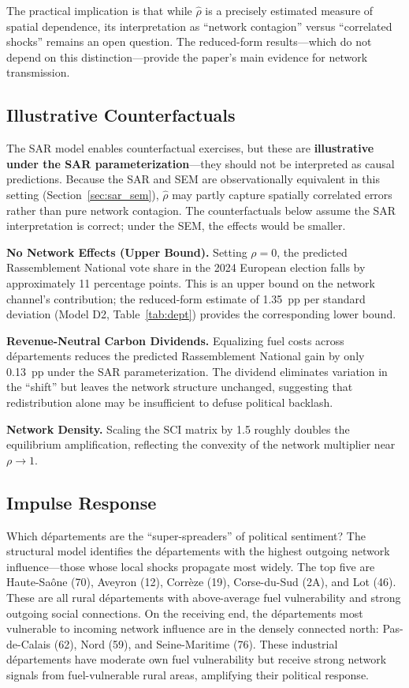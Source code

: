 \documentclass[12pt]{article}
\newcommand{\rn}{Rassemblement National}
\newcommand{\depts}{d\'{e}partements}
\begin{document}
The practical implication is that while $\hat{\rho}$ is a precisely estimated measure of spatial dependence, its interpretation as ``network contagion'' versus ``correlated shocks'' remains an open question. The reduced-form results---which do not depend on this distinction---provide the paper's main evidence for network transmission.

\subsection{Illustrative Counterfactuals}

The SAR model enables counterfactual exercises, but these are \textbf{illustrative under the SAR parameterization}---they should not be interpreted as causal predictions. Because the SAR and SEM are observationally equivalent in this setting (Section~\ref{sec:sar_sem}), $\hat{\rho}$ may partly capture spatially correlated errors rather than pure network contagion. The counterfactuals below assume the SAR interpretation is correct; under the SEM, the effects would be smaller.

\textbf{No Network Effects (Upper Bound).} Setting $\rho = 0$, the predicted \rn{} vote share in the 2024 European election falls by approximately 11 percentage points. This is an upper bound on the network channel's contribution; the reduced-form estimate of 1.35~pp per standard deviation (Model D2, Table~\ref{tab:dept}) provides the corresponding lower bound.

\textbf{Revenue-Neutral Carbon Dividends.} Equalizing fuel costs across \depts{} reduces the predicted \rn{} gain by only 0.13~pp under the SAR parameterization. The dividend eliminates variation in the ``shift'' but leaves the network structure unchanged, suggesting that redistribution alone may be insufficient to defuse political backlash.

\textbf{Network Density.} Scaling the SCI matrix by 1.5 roughly doubles the equilibrium amplification, reflecting the convexity of the network multiplier near $\rho \to 1$.

\subsection{Impulse Response}

Which \depts{} are the ``super-spreaders'' of political sentiment? The structural model identifies the \depts{} with the highest outgoing network influence---those whose local shocks propagate most widely. The top five are Haute-Sa\^{o}ne (70), Aveyron (12), Corr\`{e}ze (19), Corse-du-Sud (2A), and Lot (46). These are all rural \depts{} with above-average fuel vulnerability and strong outgoing social connections. On the receiving end, the \depts{} most vulnerable to incoming network influence are in the densely connected north: Pas-de-Calais (62), Nord (59), and Seine-Maritime (76). These industrial \depts{} have moderate own fuel vulnerability but receive strong network signals from fuel-vulnerable rural areas, amplifying their political response.
\end{document}

